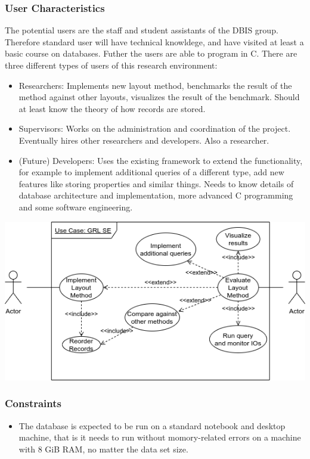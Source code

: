 	\subsubsection{User Characteristics}
		The potential users are the staff and student assistants of the DBIS group. Therefore standard user will have technical knowldege, and have visited at least a basic course on databases. Futher the users are able to program in C.
		There are three different types of users of this research environment: \\
		\begin{itemize}
			\item Researchers: Implements new layout method, benchmarks the result of the method against other layouts, visualizes the result of the benchmark. Should at least know the theory of how records are stored.
			
		 	\item Supervisors: Works on the administration and coordination of the project. Eventually hires other researchers and developers. Also a researcher.
		 	\item (Future) Developers: Uses the existing framework to extend the functionality, for example to implement additional queries of a different type, add new features like storing properties and similar things. Needs to know details of database architecture and implementation, more advanced C programming and some software engineering.
		\end{itemize}
		\begin{center}
		 \includegraphics[keepaspectratio,width=\textwidth]{img/use_case.png}
		\end{center}

	\subsubsection{Constraints}
		\begin{itemize}
			\item The database is expected to be run on a standard notebook and desktop machine, that is it needs to run without momory-related errors on a machine with 8 GiB RAM, no matter the data set size.
		\end{itemize}

